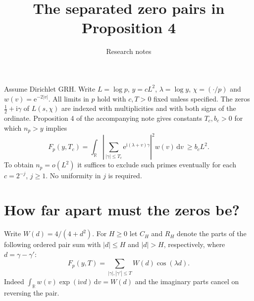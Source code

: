 \documentclass[11pt]{article}
\title{The separated zero pairs in Proposition 4}
\author{Research notes}
\date{}
\newcommand{\R}{\mathbb R}
\newcommand{\e}{\mathrm e}
\newcommand{\ii}{\mathrm i}
\newcommand{\wt}{\mathrm d}
\begin{document}
\maketitle
Assume Dirichlet GRH. Write $L=\log p$, $y=cL^2$, $\lambda=\log y$,
$\chi=(\cdot/p)$ and $w(v)=\e^{-2|v|}$. All limits in $p$ hold with
$c,T>0$ fixed unless specified. The zeros $\tfrac12+\ii\gamma$ of
$L(s,\chi)$ are indexed with multiplicities and with both signs of the
ordinate. Proposition 4 of the accompanying note gives constants
$T_c,b_c>0$ for which $n_p>y$ implies
\[
 F_p(y,T_c)=\int_{\R}\left|\sum_{|\gamma|\le T_c}
           \e^{\ii(\lambda+v)\gamma}\right|^2 w(v)\,\wt v\ \ge b_cL^2 .
\]
To obtain $n_p=o(L^2)$ it suffices to exclude such primes eventually
for each $c=2^{-j}$, $j\ge1$. No uniformity in $j$ is required.

\section{How far apart must the zeros be?}
Write $W(d)=4/(4+d^2)$. For $H\ge0$ let $C_H$ and $R_H$ denote the
parts of the following ordered pair sum with $|d|\le H$ and $|d|>H$,
respectively, where $d=\gamma-\gamma'$:
\[
 F_p(y,T)=\sum_{|\gamma|,|\gamma'|\le T}W(d)\cos(\lambda d).
 \tag{1}
\]
Indeed $\int_{\R}w(v)\exp(\ii vd)\,\wt v=W(d)$ and the imaginary
parts cancel on reversing the pair.
\end{document}
